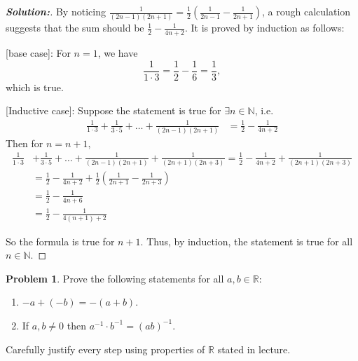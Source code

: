 \documentclass[12pt]{article}
\theoremstyle{definition}\newtheorem{problem}{Problem}
\newenvironment{solution}{\begin{proof}[\bfseries\textup{Solution:}]}{\end{proof}}
\begin{document}
\begin{solution}
By noticing $\frac{1}{(2n-1)(2n+1)} = \frac{1}{2} (\frac{1}{2n-1} - \frac{1}{2n+1}) $, a rough calculation suggests that the sum should be $ \frac{1}{2} - \frac{1}{4n+2} $. It is proved by induction as follows: 

[base case]: For $ n=1 $, we have $$ \frac{1}{1\cdot 3} = \frac{1}{2} - \frac{1}{6} = \frac{1}{3}, $$ which is true. 

[Inductive case]: Suppose the statement is true for $ \exists n \in \mathbb{N} $, i.e. \begin{align} 
\frac{1}{1 \cdot 3} + \frac{1}{3 \cdot 5} + \dots + \frac{1}{(2n-1)(2n+1)} &= \frac{1}{2} - \frac{1}{4n+2}
\end{align}
 Then for $ n = n+1, $ \begin{align} 
\frac{1}{1 \cdot 3} &+ \frac{1}{3 \cdot 5} + \dots + \frac{1}{(2n-1)(2n+1)} + \frac{1}{(2n+1)(2n+3)} = \frac{1}{2} - \frac{1}{4n+2} + \frac{1}{(2n+1)(2n+3)}  \\ 
&= \frac{1}{2} - \frac{1}{4n+2} + \frac{1}{2} (\frac{1}{2n+1} - \frac{1}{2n+3}) \\
&= \frac{1}{2} - \frac{1}{4n + 6} \\&= \frac{1}{2} - \frac{1}{4(n+1) + 2} 
 \end{align}
  
So the formula is true for $ n+1 $. Thus, by induction, the statement is true for all $ n \in \mathbb{N} $.





\end{solution}

\newpage
\begin{problem}
Prove the following statements for all $a,b\in\mathbb{R}$:
\begin{enumerate}
\item $-a + (-b) = -(a+b)$.
\item If $a,b\neq 0$ then $a^{-1}\cdot b^{-1} = (ab)^{-1}$.
\end{enumerate}
Carefully justify every step using properties of $\mathbb{R}$ stated in lecture.
\end{problem}
\end{document}
